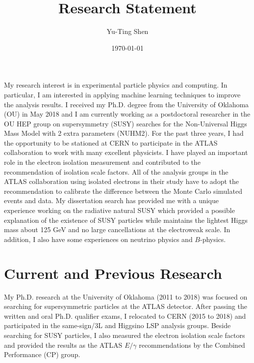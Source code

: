 \documentclass[12pt]{article}
\title{Research Statement}
\author{Yu-Ting Shen}
\affil{Department of Physics and Astronomy\\ University of Oklahoma}
\date{\today}
\begin{document}
\maketitle

My research interest is in experimental particle physics and computing.
In particular, I am interested in applying machine learning techniques to improve the analysis results.
I received my Ph.D. degree from the University of Oklahoma (OU) in May 2018 and I am currently working as a postdoctoral researcher in the OU HEP group on supersymmetry (SUSY) searches for the Non-Universal Higgs Mass Model with 2 extra parameters (NUHM2).
For the past three years, I had the opportunity to be stationed at CERN to participate in the ATLAS collaboration to work with many excellent physicists.
I have played an important role in the electron isolation measurement and contributed to the recommendation of isolation scale factors.
All of the analysis groups in the ATLAS collaboration using isolated electrons in their study have to adopt the recommendation to calibrate the difference between the Monte Carlo simulated events and data.
My dissertation search has provided me with a unique experience working on the radiative natural SUSY which provided a possible explanation of the existence of SUSY particles while maintains the lightest Higgs mass about 125 GeV and no large cancellations at the electroweak scale.
In addition, I also have some experiences on neutrino physics and $B$-physics.


\section{Current and Previous Research}
My Ph.D. research at the University of Oklahoma (2011 to 2018) was focused on searching for supersymmetric particles at the ATLAS detector.
After passing the written and oral Ph.D. qualifier exams, I relocated to CERN (2015 to 2018) and participated in the same-sign/3L and Higgsino LSP analysis groups.
Beside searching for SUSY particles, I also measured the electron isolation scale factors and provided the results as the ATLAS $E/\gamma$ recommendations by the Combined Performance (CP) group.
\end{document}
